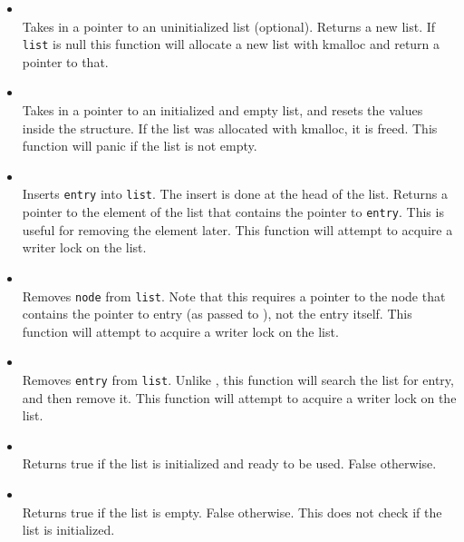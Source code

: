 \documentclass[a4paper]{article}
\begin{document}
\begin{itemize}
\item {} \\
Takes in a pointer to an uninitialized list (optional). Returns a new list. 
If \texttt{list} is null this function will allocate a new list with 
kmalloc and return a pointer to that.

\item {} \\
Takes in a pointer to an initialized and empty list, and resets the values
inside the structure. If the list was allocated with kmalloc, it is freed.
This function will panic if the list is not empty. 
\item {} \\
Inserts \texttt{entry} into \texttt{list}. The insert is done at the head of the list. 
Returns a pointer to the element of the list that contains the pointer to \texttt{entry}.
This is useful for removing the element later. This function will attempt to acquire a writer lock
on the list.

\item {} \\
Removes \texttt{node} from \texttt{list}. Note that this requires a pointer to the node that contains
the pointer to entry (as passed to ), not the entry itself. This function will attempt to acquire 
a writer lock on the list.

\item {} \\
Removes \texttt{entry} from \texttt{list}. Unlike , this function will search the
list for entry, and then remove it. This function will attempt to acquire a writer lock on the list.

\item {} \\
Returns true if the list is initialized and ready to be used. False otherwise.

\item {} \\
Returns true if the list is empty. False otherwise. This does not check if the list is initialized.


\end{itemize}
\end{document}
